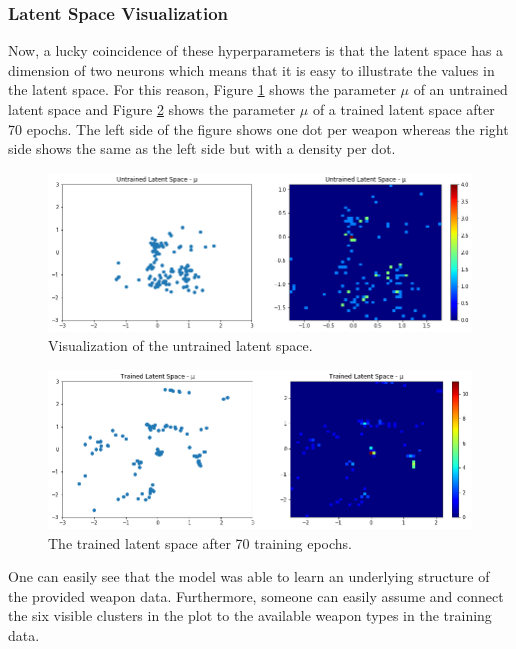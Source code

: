 \documentclass[MGS,Master,english]{twbook}%
\begin{document}
\subsubsection{Latent Space Visualization}
Now, a lucky coincidence of these hyperparameters is that the latent space has a dimension of two neurons which means that it is easy to illustrate the values in the latent space. For this reason, Figure \ref{fig::vae::untrainedLatentSpace} shows the parameter $\mu$ of an untrained latent space and Figure \ref{fig::vae::trainedLatentSpace} shows the parameter $\mu$ of a trained latent space after 70 epochs. The left side of the figure shows one dot per weapon whereas the right side shows the same as the left side but with a density per dot.
\begin{figure}[!ht]
	\centering
	\includegraphics[width=1.0\linewidth]{PICs/trained_vae/untrained_latent_space}
	\caption{Visualization of the untrained latent space.} \label{fig::vae::untrainedLatentSpace}
\end{figure}
\begin{figure}[!ht]
	\centering
	\includegraphics[width=1.0\linewidth]{PICs/trained_vae/trained_latent_space}
	\caption{The trained latent space after 70 training epochs.} \label{fig::vae::trainedLatentSpace}
\end{figure}

One can easily see that the model was able to learn an underlying structure of the provided weapon data. Furthermore, someone can easily assume and connect the six visible clusters in the plot to the available weapon types in the training data.
\end{document}
